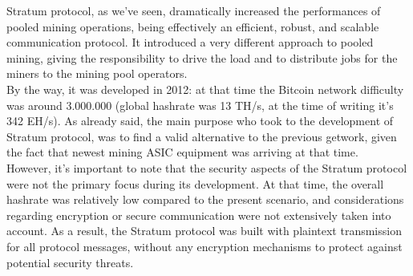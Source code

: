 Stratum protocol, as we've seen, dramatically increased the performances of pooled mining operations, being effectively an efficient, robust, and scalable communication protocol.
It introduced a very different approach to pooled mining, giving the responsibility to drive the load and to distribute jobs for the miners to the mining pool operators.\\
By the way, it was developed in 2012: at that time the Bitcoin network difficulty was around 3.000.000 (global hashrate was 13 TH/s, at the time of writing it's 342 EH/s). As already said, the main purpose who took to the development of Stratum protocol, was to find a valid alternative to the previous getwork, given the fact that newest mining ASIC equipment was arriving at that time.\\
However, it's important to note that the security aspects of the Stratum protocol were not the primary focus during its development. At that time, the overall hashrate was relatively low compared to the present scenario, and considerations regarding encryption or secure communication were not extensively taken into account. As a result, the Stratum protocol was built with plaintext transmission for all protocol messages, without any encryption mechanisms to protect against potential security threats.


